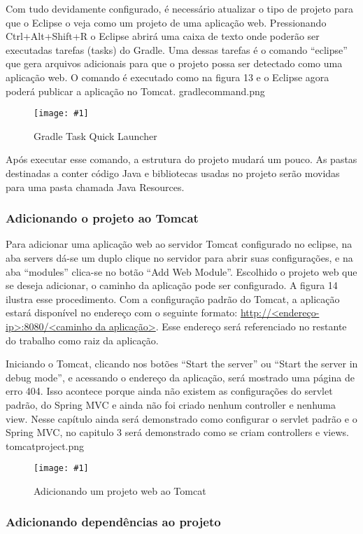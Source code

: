 \documentclass[a4paper,12pt]{article}
\newcommand{\figura}[2] {
	\begin{figure}[H]
		\centering
		\texttt{[image: \#1]}
		\caption{#2}
	\end{figure}
	\FloatBarrier
}
\begin{document}
Com tudo devidamente configurado, é necessário atualizar o tipo de projeto para que o Eclipse o veja como um projeto de uma aplicação web. Pressionando Ctrl+Alt+Shift+R o Eclipse abrirá uma caixa de texto onde poderão ser executadas tarefas (tasks) do Gradle. Uma dessas tarefas é o comando “eclipse” que gera arquivos adicionais para que o projeto possa ser detectado como uma aplicação web. O comando é executado como na figura 13 e o Eclipse agora poderá publicar a aplicação no Tomcat. gradlecommand.png

\figura{gradlecommand.png}{Gradle Task Quick Launcher}

Após executar esse comando, a estrutura do projeto mudará um pouco. As pastas destinadas a conter código Java e bibliotecas usadas no projeto serão movidas para uma pasta chamada Java Resources.

\subsubsection{Adicionando o projeto ao Tomcat}

Para adicionar uma aplicação web ao servidor Tomcat configurado no eclipse, na aba servers dá-se um duplo clique no servidor para abrir suas configurações, e na aba “modules” clica-se no botão “Add Web Module”. Escolhido o projeto web que se deseja adicionar, o caminho da aplicação pode ser configurado. A figura 14 ilustra esse procedimento. Com a configuração padrão do Tomcat, a aplicação estará disponível no endereço com o seguinte formato: \url{http://<endereço-ip>:8080/<caminho da aplicação>}. Esse endereço será referenciado no restante do trabalho como raiz da aplicação.

Iniciando o Tomcat, clicando nos botões “Start the server” ou “Start the server in debug mode”, e acessando o endereço da aplicação, será mostrado uma página de erro 404. Isso acontece porque ainda não existem as configurações do servlet padrão, do Spring MVC e ainda não foi criado nenhum controller e nenhuma view. Nesse capítulo ainda será demonstrado como configurar o servlet padrão e o Spring MVC, no capitulo 3 será demonstrado como se criam controllers e views. tomcatproject.png

\figura{tomcatproject.png}{Adicionando um projeto web ao Tomcat}

\subsubsection{Adicionando dependências ao projeto}
\end{document}
